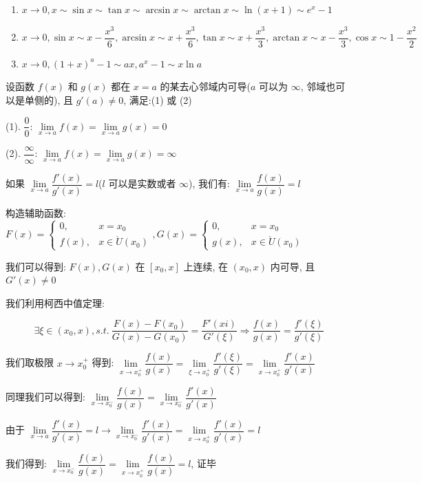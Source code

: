 \begin{corollary}[等价无穷小]
	\begin{enumerate}
		\item $x\to 0, x\sim \sin x\sim \tan x\sim \arcsin x\sim \arctan x\sim \ln(x+1)\sim e^{x}-1$
		\item $x\to 0, \sin x\sim x - \dfrac{x^{3}}{6}, \arcsin x\sim x+\dfrac{x^{3}}{6}, \tan x\sim x+\dfrac{x^{3}}{3}, \arctan x\sim x-\dfrac{x^{3}}{3},\cos x\sim 1-\dfrac{x^{2}}{2}$
		\item $x\to 0, (1+x)^{a}-1\sim ax, a^{x}-1\sim x\ln a$
	\end{enumerate}
\end{corollary}
\begin{theorem}[洛必达法则]
	设函数 $f(x)$ 和 $g(x)$ 都在 $x=a$ 的某去心邻域内可导($a$ 可以为 $\infty$, 邻域也可以是单侧的), 且 $g'(a)\neq 0$, 满足:(1) 或 (2)

	(1). $\dfrac{0}{0}$: $\lim\limits_{x\to a}f(x)=\lim\limits_{x\to a}g(x)=0$

	(2). $\dfrac{\infty}{\infty}$: $\lim\limits_{x\to a}f(x)=\lim\limits_{x\to a}g(x)=\infty$

	如果 $\lim\limits_{x\to a}\dfrac{f'(x)}{g'(x)}=l$($l$ 可以是实数或者 $\infty$), 我们有: $\lim\limits_{x\to a}\dfrac{f(x)}{g(x)}=l$
\end{theorem}
\begin{anymark}[证明]
	构造辅助函数: $F(x) = \begin{cases} 0,& x=x_{0}  \\ f(x),&x\in\mathring{U}(x_{0}) \end{cases}, G(x)= \begin{cases} 0,& x=x_{0}  \\ g(x),&x\in\mathring{U}(x_{0}) \end{cases} $

	我们可以得到: $F(x),G(x)$ 在 $[x_{0},x]$ 上连续, 在 $(x_{0},x)$ 内可导, 且 $G'(x)\neq 0$
	
	我们利用柯西中值定理:
	
	$$\exists \xi\in (x_{0},x), s.t.\ \dfrac{F(x)-F(x_{0})}{G(x)-G(x_{0})}= \dfrac{F'(xi)}{G'(\xi)}\Rightarrow \dfrac{f(x)}{g(x)} = \dfrac{f'(\xi)}{g'(\xi)}$$

	我们取极限 $x\to x_{0}^{+}$ 得到: $\lim\limits_{x\to x_{0}^{+}}\dfrac{f(x)}{g(x)} = \lim\limits_{\xi\to x_{0}^{+}}\dfrac{f'(\xi)}{g'(\xi)} = \lim\limits_{x\to x_{0}^{+}}\dfrac{f'(x)}{g'(x)} $

	同理我们可以得到: $\lim\limits_{x\to x_{0}^{-}}\dfrac{f(x)}{g(x)} = \lim\limits_{x\to x_{0}^{-}}\dfrac{f'(x)}{g'(x)} $
	
	由于 $\lim\limits_{x\to a}\dfrac{f'(x)}{g'(x)}=l\to \lim\limits_{x\to x_{0}^{-}}\dfrac{f'(x)}{g'(x)} = \lim\limits_{x\to x_{0}^{+}}\dfrac{f'(x)}{g'(x)}=l$

	我们得到: $\lim\limits_{x\to x_{0}^{-}}\dfrac{f(x)}{g(x)} = \lim\limits_{x\to x_{0}^{+}}\dfrac{f(x)}{g(x)} = l$, 证毕
\end{anymark}
